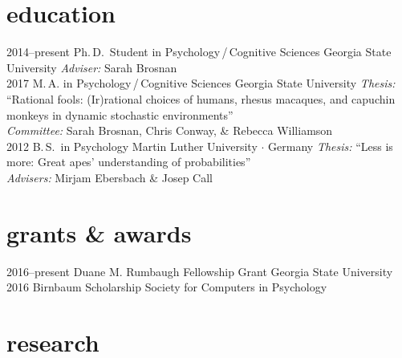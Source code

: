 \documentclass[]{friggeri-cv}
\begin{document}
\section{education}

\begin{entrylist}
  \entry
    {2014--present}
    {Ph.\,D.~Student in Psychology\,/\,Cognitive Sciences}
    {Georgia State University}
    {\emph{Adviser:} Sarah Brosnan\\[-.3cm]}
 \entry
   {2017}
   {M.\,A. in Psychology\,/\,Cognitive Sciences}
   {Georgia State University}
   {\emph{Thesis:} ``Rational fools: (Ir)rational choices of humans, rhesus macaques, and capuchin monkeys in dynamic stochastic environments''\\
   \emph{Committee:} Sarah Brosnan, Chris Conway, \& Rebecca Williamson\\[-.3cm]}
  \entry
    {2012}
    {B.\,S.~in Psychology}
    {Martin Luther University $\cdot$ Germany}
    {\emph{Thesis:} ``Less is more: Great apes' understanding of probabilities''\\
    \emph{Advisers:} Mirjam Ebersbach \& Josep Call}
\end{entrylist}


\section{grants \& awards}

\begin{entrylist}
  \entry
    {2016--present}
    {Duane M. Rumbaugh Fellowship Grant}
    {Georgia State University}
    {\\[-.7cm]}
  \entry
    {2016}
    {Birnbaum Scholarship}
    {Society for Computers in Psychology}
    {}
\end{entrylist}


\section{research}
\end{document}
